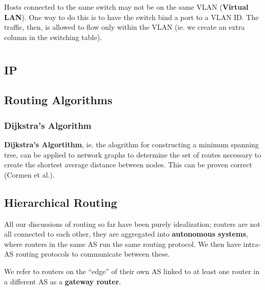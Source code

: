 \documentclass[12pt]{article}
\begin{document}
Hosts connected to the same switch may not be on the same VLAN ({\bf Virtual LAN}). One way to do this is to have the switch bind a port to a VLAN ID. The traffic, then, is allowed to flow only within the VLAN (ie. we create an extra column in the switching table).


\section{}

\subsection{IP}

\subsection{Routing Algorithms}

\subsubsection{Dijkstra's Algorithm}
{\bf Dijkstra's Algortithm}, ie. the alogrithm for constructing a minimum spanning tree, can be applied to network graphs to determine the set of routes necessary to create the shortest average distance between nodes. This can be proven correct (Cormen et al.).


\subsection{Hierarchical Routing}
All our discussions of routing so far have been purely idealization; routers are not all connected to each other, they are aggregated into {\bf autonomous systems}, where routers in the same AS run the same routing protocol. We then have intra-AS routing protocols to communicate between these.

We refer to routers on the ``edge'' of their own AS linked to at least one router in a different AS as a {\bf gateway router}.
\end{document}
